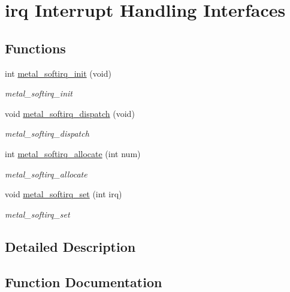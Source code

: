 \hypertarget{group__soft}{}\section{irq Interrupt Handling Interfaces}
\label{group__soft}
\subsection*{Functions}
\begin{DoxyCompactItemize}
\item 
int \hyperlink{group__soft_gaa63f0ba17ed4114bb70e9f3981e0cb33}{metal\+\_\+softirq\+\_\+init} (void)
\begin{DoxyCompactList}\small\item\em metal\+\_\+softirq\+\_\+init \end{DoxyCompactList}\item 
void \hyperlink{group__soft_gabe237beb3e113a94557bdea1603416a6}{metal\+\_\+softirq\+\_\+dispatch} (void)
\begin{DoxyCompactList}\small\item\em metal\+\_\+softirq\+\_\+dispatch \end{DoxyCompactList}\item 
int \hyperlink{group__soft_ga7222ffe2120ad4591f50c80757fae85e}{metal\+\_\+softirq\+\_\+allocate} (int num)
\begin{DoxyCompactList}\small\item\em metal\+\_\+softirq\+\_\+allocate \end{DoxyCompactList}\item 
void \hyperlink{group__soft_gad825e34f93638fe47be10da3f19dacf8}{metal\+\_\+softirq\+\_\+set} (int irq)
\begin{DoxyCompactList}\small\item\em metal\+\_\+softirq\+\_\+set \end{DoxyCompactList}\end{DoxyCompactItemize}


\subsection{Detailed Description}


\subsection{Function Documentation}
\mbox{\label{group__soft_ga7222ffe2120ad4591f50c80757fae85e}} 
